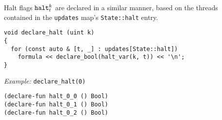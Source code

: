 

\noindent
Halt flags $\texttt{halt}^k_t$ are declared in a similar manner, based on the threads contained in the \texttt{updates} map's \texttt{State::halt} entry.

\newpage
\begin{lstlisting}[style=c++]
void declare_halt (uint k)
{
  for (const auto & [t, _] : updates[State::halt])
    formula << declare_bool(halt_var(k, t)) << '\n';
}
\end{lstlisting}

\noindent
\emph{Example:} \lstinline[style=c++]{declare_halt(0)}

\begin{lstlisting}[language=SMTLib]
(declare-fun halt_0_0 () Bool)
(declare-fun halt_0_1 () Bool)
(declare-fun halt_0_2 () Bool)
\end{lstlisting}






